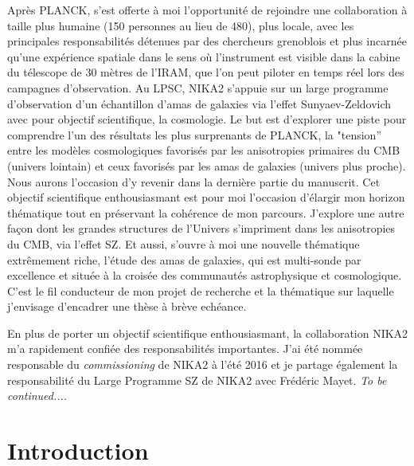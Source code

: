 \documentclass[a4paper, 12pt]{report}
\begin{document}
Après PLANCK, s'est offerte à moi l'opportunité de rejoindre une
collaboration à taille plus humaine (150 personnes au lieu de 480),
plus locale, avec les principales responsabilités détenues par des
chercheurs grenoblois et plus incarnée qu'une expérience spatiale dans
le sens où l'instrument est visible dans la cabine du télescope de 30
mètres de l'IRAM, que l'on peut piloter en temps réel lors des
campagnes d'observation. Au LPSC, NIKA2 s'appuie sur un large
programme d'observation d'un échantillon d'amas de galaxies via
l'effet Sunyaev-Zeldovich avec pour objectif scientifique, la
cosmologie. Le but est d'explorer une piste pour comprendre l'un des
résultats les plus surprenants de PLANCK, la "tension'' entre les
modèles cosmologiques favorisés par les anisotropies primaires du CMB
(univers lointain) et ceux favorisés par les amas de galaxies (univers
plus proche). Nous aurons l'occasion d'y revenir dans la dernière
partie du manuscrit. Cet objectif scientifique enthousiasmant est pour
moi l'occasion d'élargir mon horizon thématique tout en préservant la
cohérence de mon parcours. J'explore une autre façon dont
les grandes structures de l'Univers s'impriment dans les anisotropies
du CMB, via l'effet SZ. Et aussi, s'ouvre à moi une nouvelle
thématique extrêmement riche, l'étude des amas de galaxies, qui est
multi-sonde par excellence et située à la croisée des communautés
astrophysique et cosmologique. C'est le fil conducteur de mon projet
de recherche et la thématique sur laquelle j'envisage d'encadrer une
thèse à brève echéance.

En plus de porter un objectif scientifique enthousiasmant, la
collaboration NIKA2 m'a rapidement confiée des responsabilités
importantes. J'ai été nommée responsable du \emph{commissioning} de
NIKA2 à l'été 2016 et je partage également la responsabilité du Large
Programme SZ de NIKA2 avec Frédéric Mayet. \emph{To be continued....}  




\chapter*{Introduction}




%
%
%
%
%
%
%
\end{document}
